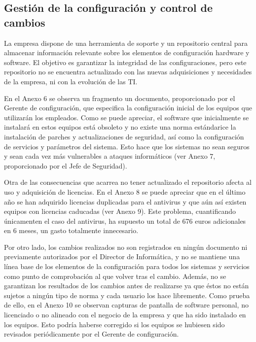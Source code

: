 \subsection {Gestión de la configuración y control de cambios}

\begin{spacing}{1.4}

La empresa dispone de una herramienta de soporte y un repositorio central para almacenar información relevante sobre los elementos de configuración hardware y software. El objetivo es garantizar la integridad de las configuraciones, pero este repositorio no se encuentra actualizado con las nuevas adquisiciones y necesidades de la empresa, ni con la evolución de las TI.

En el Anexo 6 se observa un fragmento un documento, proporcionado por el Gerente de configuración, que especifica la configuración inicial de los equipos que utilizarán los empleados. Como se puede apreciar, el software que inicialmente se instalará en estos equipos está obsoleto y no existe una norma estándarice la instalación de parches y actualizaciones de seguridad, así como la configuración de servicios y parámetros del sistema. Esto hace que los sistemas no sean seguros y sean cada vez más vulnerables a ataques informáticos (ver Anexo 7, proporcionado por el Jefe de Seguridad).

Otra de las consecuencias que acarrea no tener actualizado el repositorio afecta al uso y adquisición de licencias. En el Anexo 8 se puede apreciar que en el último año se han adquirido licencias duplicadas para el antivirus y que aún así existen equipos con licencias caducadas (ver Anexo 9). Este problema, cuantificando únicamenten el caso del antivirus, ha supuesto un total de 676 euros adicionales en 6 meses, un gasto totalmente innecesario.

Por otro lado, los cambios realizados no son registrados en ningún documento ni previamente autorizados por el Director de Informática, y no se mantiene una línea base de los elementos de la configuración para todos los sistemas y servicios como punto de comprobación al que volver tras el cambio. Además, no se garantizan los resultados de los cambios antes de realizarse ya que éstos no están sujetos a ningún tipo de norma y cada usuario los hace libremente. Como prueba de ello, en el Anexo 10 se observan capturas de pantalla de software personal, no licenciado o no alineado con el negocio de la empresa y que ha sido instalado en los equipos. Esto podría haberse corregido si los equipos se hubiesen sido revisados periódicamente por el Gerente de configuración.

\end{spacing}